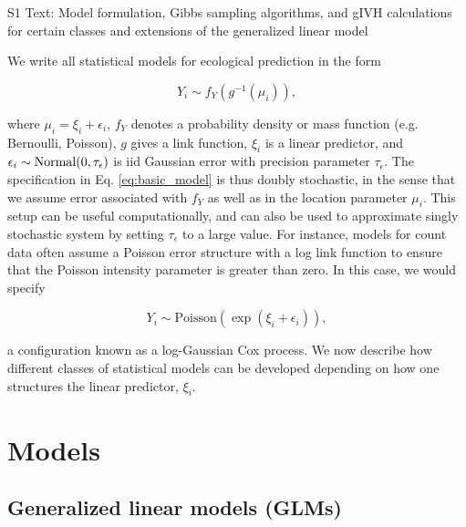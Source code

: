 \documentclass[12pt,fleqn]{article}
\begin{document}
\rm \begin{flushleft}

\raggedbottom
\vspace{.5in}

\begin{center}
S1 Text: Model formulation, Gibbs sampling algorithms, and gIVH calculations for certain classes and extensions of the generalized linear model
\bigskip
\end{center}
\vspace{.3in}

\doublespacing



We write all statistical models for ecological prediction in the form
\begin{linenomath*}
\begin{equation}
  \label{eq:basic_model}
  Y_i \sim f_Y(g^{-1}(\mu_i)),
\end{equation}
\end{linenomath*}
where $\mu_i=\xi_i + \epsilon_i$, $f_Y$ denotes a probability density or mass function (e.g. Bernoulli, Poisson), $g$ gives a link function,
$\xi_i$ is a linear predictor, and $\epsilon_i \sim {\rm Normal}(0,\tau_\epsilon)$ is iid Gaussian error with precision parameter $\tau_\epsilon$.  The specification in Eq. \ref{eq:basic_model} is thus doubly stochastic, in the sense that we assume error associated with $f_Y$ as well as in the location parameter $\mu_i$.  This setup can be useful computationally, and can also be used to approximate singly stochastic system by setting $\tau_\epsilon$ to a large value.  For instance, models for count data often assume a Poisson error structure with a log link function to ensure that the Poisson intensity parameter is greater than zero.  In this case, we would specify
\begin{linenomath*}
\begin{equation*}
  Y_i \sim \mathrm{Poisson}(\exp(\xi_i + \epsilon_i)),
\end{equation*}
\end{linenomath*}
a configuration known as a log-Gaussian Cox process.
We now describe how different classes of statistical models can be developed depending on how one structures the linear predictor, $\xi_i$.

\section{Models}
\subsection{Generalized linear models (GLMs)}


\end{flushleft}
\end{document}
